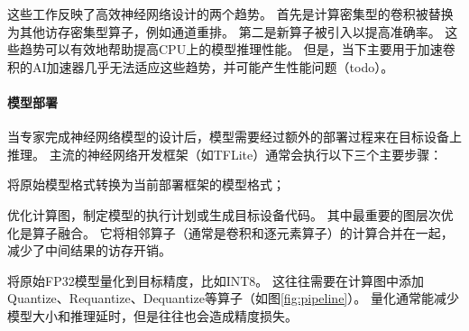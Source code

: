 这些工作反映了高效神经网络设计的两个趋势。
首先是计算密集型的卷积被替换为其他访存密集型算子，例如通道重排。
第二是新算子被引入以提高准确率。
这些趋势可以有效地帮助提高CPU上的模型推理性能。
但是，当下主要用于加速卷积的AI加速器几乎无法适应这些趋势，并可能产生性能问题（todo）。

\paragraph{模型部署}
当专家完成神经网络模型的设计后，模型需要经过额外的部署过程来在目标设备上推理。
主流的神经网络开发框架（如TFLite）通常会执行以下三个主要步骤：
\begin{enumerate*}
    \item 将原始模型格式转换为当前部署框架的模型格式；
    \item 优化计算图，制定模型的执行计划或生成目标设备代码。
    其中最重要的图层次优化是算子融合。
    它将相邻算子（通常是卷积和逐元素算子）的计算合并在一起，减少了中间结果的访存开销。
    \item 将原始FP32模型量化到目标精度，比如INT8。
    这往往需要在计算图中添加Quantize、Requantize、Dequantize等算子（如图\ref{fig:pipeline}）。
    量化通常能减少模型大小和推理延时，但是往往也会造成精度损失。
\end{enumerate*}
